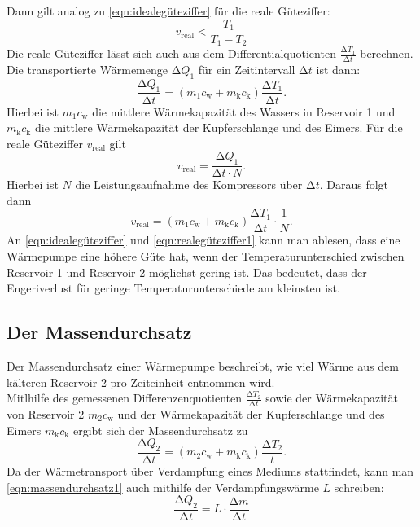 \documentclass{scrartcl} %
\begin{document}
	Dann gilt analog zu \eqref{eqn:idealegüteziffer} für die reale Güteziffer:
	\begin{equation}
		v_\text{real} < \frac{T_\text{1}}{T_\text{1}-T_\text{2}}
		\label{eqn:realegüteziffer1}
	\end{equation}
  Die reale Güteziffer lässt sich auch aus dem Differentialquotienten $ \frac{\increment T_\text{1}}{\increment t}$ berechnen. Die transportierte Wärmemenge $\increment Q_\text{1}$
  für ein Zeitintervall $\increment t$ ist dann:
  \begin{equation}
    \frac{\increment Q_\text{1}}{\increment t} = (m_\text{1}c_\text{w} + m_\text{k}c_\text{k}) \frac{\increment T_\text{1}}{\increment t}.
    \label{eqn:realegüteziffer2}
  \end{equation}
  Hierbei ist $m_\text{1}c_\text{w}$ die mittlere Wärmekapazität des Wassers in Reservoir 1 und $m_\text{k}c_\text{k}$ die mittlere Wärmekapazität der Kupferschlange und des Eimers.
  Für die reale Güteziffer $v_\text{real}$ gilt
  \begin{equation}
    v_\text{real} = \frac{\increment Q_\text{1}}{\increment t \cdot N}.
  \end{equation}
  Hierbei ist $N$ die Leistungsaufnahme des Kompressors über $\increment t$. Daraus folgt dann
  \begin{equation}
    v_\text{real} = (m_\text{1}c_\text{w} + m_\text{k}c_\text{k}) \frac{\increment T_\text{1}}{\increment t} \cdot \frac{1}{N}.
    \label{eqn:realegüteziffer3}
  \end{equation}
	An \eqref{eqn:idealegüteziffer} und \eqref{eqn:realegüteziffer1} kann man ablesen, dass eine Wärmepumpe eine höhere Güte hat,
	wenn der Temperaturunterschied zwischen Reservoir 1 und Reservoir 2 möglichst gering ist. Das bedeutet, dass der Engeriverlust
	für geringe Temperaturunterschiede am kleinsten ist.
	\subsection{Der Massendurchsatz}
	Der Massendurchsatz einer Wärmepumpe beschreibt, wie viel Wärme aus dem kälteren Reservoir 2 pro Zeiteinheit entnommen wird. \\
	Mitlhilfe des gemessenen Differenzenquotienten $ \frac{\increment T_\text{2}}{\increment t}$ sowie der Wärmekapazität von Reservoir 2
	$m_\text{2}c_\text{w}$ und der Wärmekapazität der Kupferschlange und des Eimers $m_\text{k}c_\text{k}$ ergibt sich der Massendurchsatz
	zu
	\begin{equation}
		\frac{\increment Q_\text{2}}{\increment t} = (m_\text{2} c_\text{w} + m_\text{k} c_\text{k}) \frac{\increment T_\text{2}}{t}.
		\label{eqn:massendurchsatz1}
	\end{equation}
	Da der Wärmetransport über Verdampfung eines Mediums stattfindet, kann man \eqref{eqn:massendurchsatz1} auch mithilfe der
	Verdampfungswärme $L$ schreiben:
	\begin{equation}
		\frac{\increment Q_\text{2}}{\increment t} = L \cdot \frac{\increment m}{\increment t}
		\label{eqn:massendurchsatz2}
	\end{equation}
\end{document}
